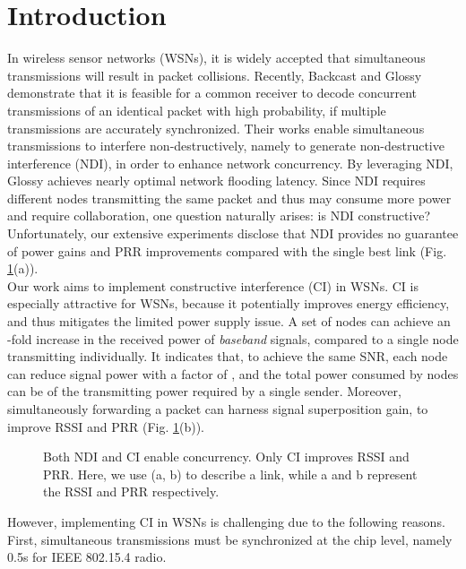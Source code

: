 \documentclass[conference]{IEEEtran}
\begin{document}
\section{Introduction}
In wireless sensor networks (WSNs), it is widely accepted that simultaneous transmissions will result in packet collisions.
Recently, Backcast\cite{DuttaSensys10Backcast} and Glossy\cite{ferrari11Glossy} demonstrate that it is feasible for a common receiver to decode concurrent transmissions of an identical packet with high probability, if multiple transmissions are accurately synchronized.
Their works enable simultaneous transmissions to interfere non-destructively, namely to generate non-destructive interference (NDI), in order to enhance network concurrency.
By leveraging NDI, Glossy achieves nearly optimal network flooding latency.
Since NDI requires different nodes transmitting the same packet and thus may consume more power and require collaboration, one question naturally arises: is NDI constructive? Unfortunately, our extensive experiments disclose that NDI provides no guarantee of power gains and PRR improvements compared with the single best link (Fig. \ref{Fig_NDIandCI}(a)).\\
\indent  Our work aims to implement constructive interference (CI) in WSNs.
CI is especially attractive for WSNs, because it potentially improves energy efficiency, and thus mitigates the limited power supply issue.
A set of  nodes can achieve an -fold increase in the received power of \emph{baseband} signals, compared to a single node transmitting individually.
It indicates that, to achieve the same SNR, each node can reduce signal power with a factor of , and the total power consumed by  nodes can be  of the transmitting power required by a single sender.
Moreover, simultaneously forwarding a packet can harness signal superposition gain, to improve RSSI and PRR (Fig. \ref{Fig_NDIandCI}(b)).\\
\begin{figure}
\centering
\caption{Both NDI and CI enable concurrency. Only CI improves RSSI and PRR. Here, we use (a, b) to describe a link, while a and b represent the RSSI and PRR respectively.}
{\label{Fig_NDIandCI}}
\end{figure}
\indent However, implementing CI in WSNs is challenging due to the following reasons. First, simultaneous transmissions must be synchronized at the chip level, namely 0.5s for IEEE 802.15.4 radio.
\end{document}
